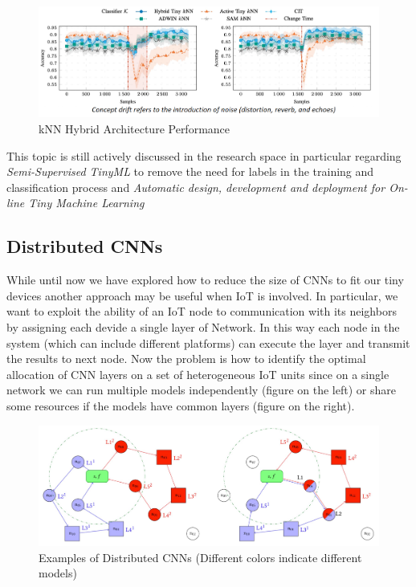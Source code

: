 \documentclass{article}
\begin{document}
      \begin{figure}[H]
        \includegraphics[scale=0.35]{../Images/HybridPerformance.png}
        \centering
        \caption{kNN Hybrid Architecture Performance}
      \end{figure}

      This topic is still actively discussed in the research space in particular regarding \emph{Semi-Supervised TinyML} to remove the need for labels in the training and classification process and \emph{Automatic design, development and deployment for On-line Tiny Machine Learning}
    \subsection{Distributed CNNs}
      While until now we have explored how to reduce the size of CNNs to fit our tiny devices another approach may be useful when IoT is involved. In particular, we want to exploit the ability of an IoT node to communication with its neighbors by assigning each devide a single layer of Network. In this way each node in the system (which can include different platforms) can execute the layer and
      transmit the results to next node. Now the problem is how to identify the optimal allocation of CNN layers on a set of heterogeneous IoT units since on a single network we can run multiple models independently (figure on the left) or share some resources if the models have common layers (figure on the right).

      \begin{figure}[H]
        \includegraphics[scale=0.35]{../Images/DistributedCNN.png}
        \centering
        \caption{Examples of Distributed CNNs (Different colors indicate different models)}
      \end{figure}
\end{document}
